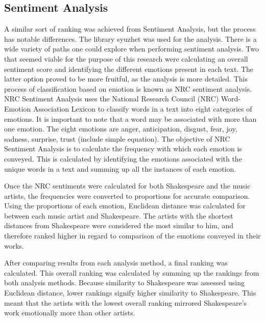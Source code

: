 \documentclass[10pt,a4paper]{article}
\begin{document}
\subsection{Sentiment Analysis}
A similar sort of ranking was achieved from Sentiment Analysis, but the process has notable differences. The library syuzhet was used for the analysis. There is a wide variety of paths one could explore when performing sentiment analysis. Two that seemed viable for the purpose of this research were calculating an overall sentiment score and identifying the different emotions present in each text. \cite{syuzhet} The latter option proved to be more fruitful, as the analysis is more detailed. This process of classification based on emotion is known as NRC sentiment analysis. NRC Sentiment Analysis uses the National Research Council (NRC) Word-Emotion Association Lexicon to classify words in a text into eight categories of emotions. \cite{nrc-sentiment} It is important to note that a word may be associated with more than one emotion. The eight emotions are anger, anticipation, disgust, fear, joy, sadness, surprise, trust (include simple equation). \cite{nrc-sentiment} The objective of NRC Sentiment Analysis is to calculate the frequency with which each emotion is conveyed. This is calculated by identifying the emotions associated with the unique words in a text and summing up all the instances of each emotion\cite{syuzhet}. 

\noindent Once the NRC sentiments were calculated for both Shakespeare and the music artists, the frequencies were converted to proportions for accurate comparison. Using the proportions of each emotion, Euclidean distance was calculated for between each music artist and Shakespeare. The artists with the shortest distances from Shakespeare were considered the most similar to him, and therefore ranked higher in regard to comparison of the emotions conveyed in their works. 

\noindent After comparing results from each analysis method, a final ranking was calculated. This overall ranking was calculated by summing up the rankings from both analysis methods. Because similarity to Shakespeare was assessed using Euclidean distance, lower rankings signify higher similarity to Shakespeare. This meant that the artists with the lowest overall ranking mirrored Shakespeare’s work emotionally more than other artists.
\end{document}
